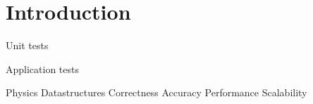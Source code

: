 \documentclass{article}
\begin{document}

\section{Introduction} \label{s:intro}

Unit tests

Application tests

Physics
Datastructures
Correctness
Accuracy
Performance
Scalability
\end{document}
